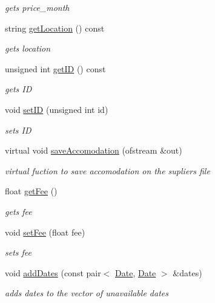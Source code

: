 \begin{DoxyCompactItemize}
\begin{DoxyCompactList}\small\item\em gets price\+\_\+month \end{DoxyCompactList}\item 
string \hyperlink{class_accomodation_a4412dad54b791d4db1ebd01176c1333e}{get\+Location} () const
\begin{DoxyCompactList}\small\item\em gets location \end{DoxyCompactList}\item 
unsigned int \hyperlink{class_accomodation_a04d05660220ad6ad31619bdf9bab28e9}{get\+ID} () const
\begin{DoxyCompactList}\small\item\em gets ID \end{DoxyCompactList}\item 
void \hyperlink{class_accomodation_a3d06b872d484b5aa2455d65d98b63645}{set\+ID} (unsigned int id)
\begin{DoxyCompactList}\small\item\em sets ID \end{DoxyCompactList}\item 
virtual void \hyperlink{class_accomodation_a4394eb907b2d5a23faf73dd03c1dac4d}{save\+Accomodation} (ofstream \&out)
\begin{DoxyCompactList}\small\item\em virtual fuction to save accomodation on the supliers file \end{DoxyCompactList}\item 
float \hyperlink{class_accomodation_aa37ad0d3356128f880c00b647d2f2bff}{get\+Fee} ()
\begin{DoxyCompactList}\small\item\em gets fee \end{DoxyCompactList}\item 
void \hyperlink{class_accomodation_a9fc9164c6a0a353538e422ec36db43f4}{set\+Fee} (float fee)
\begin{DoxyCompactList}\small\item\em sets fee \end{DoxyCompactList}\item 
void \hyperlink{class_accomodation_aefbbf86e80b202ca4879fb695cdb7d3d}{add\+Dates} (const pair$<$ \hyperlink{class_date}{Date}, \hyperlink{class_date}{Date} $>$ \&dates)
\begin{DoxyCompactList}\small\item\em adds dates to the vector of unavailable dates \end{DoxyCompactList}\item 

\end{DoxyCompactItemize}
